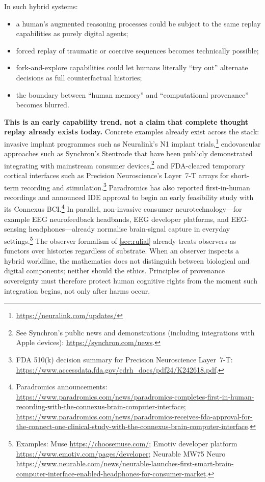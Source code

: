 \documentclass[11pt]{article}
\theoremstyle{definition}
\theoremstyle{plain}
\theoremstyle{remark}
\begin{document}
In such hybrid systems:
\begin{itemize}[leftmargin=*]
  \item a human's augmented reasoning processes could be subject to
    the same replay capabilities as purely digital agents;
  \item forced replay of traumatic or coercive sequences becomes
    technically possible;
  \item fork-and-explore capabilities could let humans literally
    ``try out'' alternate decisions as full counterfactual histories;
  \item the boundary between ``human memory'' and
    ``computational provenance'' becomes blurred.
\end{itemize}
\noindent\textbf{This is an early capability trend, not a claim that complete thought replay already exists today.}
Concrete examples already exist across the stack: invasive implant programmes such as Neuralink's N1
implant trials,\footnote{\url{https://neuralink.com/updates/}} endovascular approaches such as
Synchron's Stentrode that have been publicly demonstrated integrating with mainstream consumer
devices,\footnote{See Synchron's public news and demonstrations (including integrations with Apple
devices): \url{https://synchron.com/news}.} and FDA-cleared temporary cortical interfaces such as
Precision Neuroscience's Layer~7-T arrays for short-term recording and stimulation.\footnote{FDA 510(k)
decision summary for Precision Neuroscience Layer~7-T: \url{https://www.accessdata.fda.gov/cdrh_docs/pdf24/K242618.pdf}.}
Paradromics has also reported first-in-human recordings and announced IDE approval to begin an early
feasibility study with its Connexus BCI.\footnote{Paradromics announcements:
\url{https://www.paradromics.com/news/paradromics-completes-first-in-human-recording-with-the-connexus-brain-computer-interface};
\url{https://www.paradromics.com/news/paradromics-receives-fda-approval-for-the-connect-one-clinical-study-with-the-connexus-brain-computer-interface}.}
In parallel, non-invasive consumer neurotechnology---for example EEG neurofeedback headbands, EEG
developer platforms, and EEG-sensing headphones---already normalise brain-signal capture in everyday
settings.\footnote{Examples: Muse \url{https://choosemuse.com/}; Emotiv developer platform
\url{https://www.emotiv.com/pages/developer}; Neurable MW75 Neuro \url{https://www.neurable.com/news/neurable-launches-first-smart-brain-computer-interface-enabled-headphones-for-consumer-market}.}
The observer formalism of \cref{sec:rulial} already treats observers as
functors over histories regardless of substrate.  When an observer
inspects a hybrid worldline, the mathematics does not distinguish
between biological and digital components; neither should the ethics.
Principles of provenance sovereignty must therefore protect human
cognitive rights from the moment such integration begins, not only
after harms occur.
\end{document}
